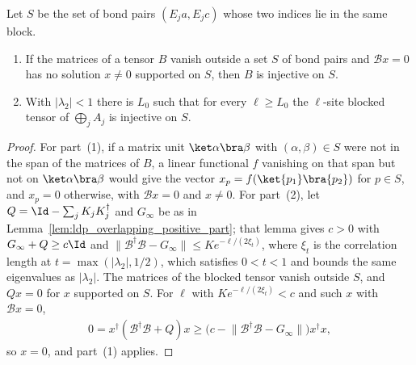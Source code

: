 \begin{lemma}
    \label{lem:ldp_overlapping_block_injectivity}
    \leanok
    Let $S$ be the set of bond pairs $(E_ja,E_jc)$ whose two indices lie in the
    same block.
    \begin{enumerate}
        \item If the matrices of a tensor $B$ vanish outside a set $S$ of bond
              pairs and $\mathcal Bx=0$ has no solution $x\neq0$ supported on
              $S$, then $B$ is injective on $S$.
        \item With $|\lambda_2|<1$ there is $L_0$ such that for every $\ell\geq
                  L_0$ the $\ell$-site blocked tensor of $\bigoplus_jA_j$ is
              injective on $S$.
    \end{enumerate}
\end{lemma}
\begin{proof}
    \leanok
    For part~(1), if a matrix unit $\ket\alpha\bra\beta$ with $(\alpha,\beta)\in
        S$ were not in the span of the matrices of $B$, a linear functional $f$
    vanishing on that span but not on $\ket\alpha\bra\beta$ would give the vector
    $x_p=f(\ket{p_1}\bra{p_2})$ for $p\in S$, and $x_p=0$ otherwise, with
    $\mathcal Bx=0$ and $x\neq0$. For part~(2), let
    $Q=\Id-\sum_jK_jK_j^\dagger$ and $G_\infty$ be as in
    Lemma~\ref{lem:ldp_overlapping_positive_part}; that lemma gives $c>0$ with
    $G_\infty+Q\geq c\Id$ and
    $\lVert\mathcal B^\dagger\mathcal B-G_\infty\rVert\leq Ke^{-\ell/(2\xi_t)}$,
    where $\xi_t$ is the correlation length at $t=\max(\lvert\lambda_2\rvert,1/2)$,
    which satisfies $0<t<1$ and bounds the same eigenvalues as $\lvert\lambda_2\rvert$.
    The matrices of the blocked tensor vanish outside $S$, and $Qx=0$ for $x$
    supported on $S$. For $\ell$ with $Ke^{-\ell/(2\xi_t)}<c$ and such $x$ with
    $\mathcal Bx=0$,
    \begin{align*}
        0=x^\dagger(\mathcal B^\dagger\mathcal B+Q)x
        \geq\bigl(c-\lVert\mathcal B^\dagger\mathcal B-G_\infty\rVert\bigr)
        x^\dagger x,
    \end{align*}
    so $x=0$, and part~(1) applies.
\end{proof}

